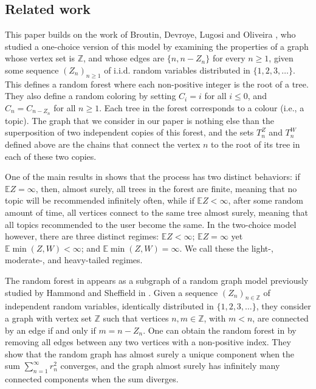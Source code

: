 \documentclass[12pt]{article}
\newcommand{\Z}{\mathbb{Z}}
\newcommand{\E}{\mathbb{E}}
\numberwithin{equation}{section} \font\titre=cmbx12
\begin{document}
\subsection{Related work}
This paper builds on the work of Broutin, Devroye, Lugosi and Oliveira \cite{surf}, who studied a one-choice version of this model by examining the properties of a graph whose vertex set is $\Z$, and whose edges are $\{n,n-Z_n\}$ for every $n\ge 1$, given some sequence $(Z_n)_{n\ge 1}$ of i.i.d. random variables distributed in $\{1,2,3,\dots\}$. This defines a random forest where each non-positive integer is the root of a tree. They also define a random coloring by setting $C_i=i$ for all $i\le 0$, and $C_n=C_{n-Z_n}$ for all $n\ge 1$. Each tree in the forest corresponds to a colour (i.e., a topic). The graph that we consider in our paper is nothing else than the superposition of two independent copies of this forest, and the sets $T_n^Z$ and $T_n^W$ defined above are the chains that connect the vertex $n$ to the root of its tree in each of these two copies.

One of the main results in \cite{surf} shows that the process has two
distinct behaviors: if $\E Z=\infty$, then, almost surely, all trees
in the forest are finite, meaning that no topic will be recommended
infinitely often, while if $\E Z < \infty$, after some random amount
of time, all vertices connect to the same tree almost surely, meaning
that all topics recommended to the user become the same. 
In the two-choice
model however, there are three distinct regimes: $\E Z <\infty$; $\E Z= \infty$ yet
$\E \min(Z,W)<\infty$; and $\E \min(Z, W) = \infty$.
We call these the light-, moderate-, and heavy-tailed regimes.


The random forest in \cite{surf} appears as a subgraph of a random graph model previously studied by Hammond and Sheffield in \cite{hammondsheffield2013}. Given a sequence $(Z_n)_{n\in \Z}$ of independent random variables, identically distributed in $\{1,2,3,\dots\}$, they consider a graph with vertex set $\Z$ such that vertices $n,m\in \Z$, with $m<n$, are connected by an edge if and only if $m=n-Z_n$. One can obtain the random forest in \cite{surf} by removing all edges between any two vertices with a non-positive index. They show that the random graph has almost surely a unique component when the sum $\sum_{n=1}^\infty r_n^2$ converges, and the graph almost surely has infinitely many connected components when the sum diverges.
\end{document}
